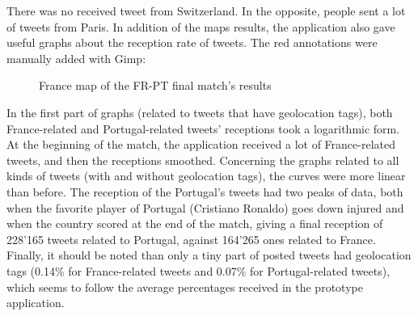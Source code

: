 \documentclass[a4paper,11pt]{report}
\begin{document}
There was no received tweet from Switzerland. In the opposite, people sent a lot of tweets from Paris. In addition of the maps results, the application also gave useful graphs about the reception rate of tweets. The red annotations were manually added with Gimp:
\begin{figure}[H]
\vspace{-5pt}
\begin{center}
\vspace{-20pt}
\caption{France map of the FR-PT final match's results}
\end{center}
\end{figure}
\vspace{-10pt}

In the first part of graphs (related to tweets that have geolocation tags), both France-related and Portugal-related tweets' receptions took a logarithmic form. At the beginning of the match, the application received a lot of France-related tweets, and then the receptions smoothed.
Concerning the graphs related to all kinds of tweets (with and without geolocation tags), the curves were more linear than before. The reception of the Portugal's tweets had two peaks of data, both when the favorite player of Portugal (Cristiano Ronaldo) goes down injured and when the country scored at the end of the match, giving a final reception of 228'165 tweets related to Portugal, against 164'265 ones related to France. Finally, it should be noted than only a tiny part of posted tweets had geolocation tags (0.14\% for France-related tweets and 0.07\% for Portugal-related tweets), which seems to follow the average percentages received in the prototype application.
\newpage
\end{document}
